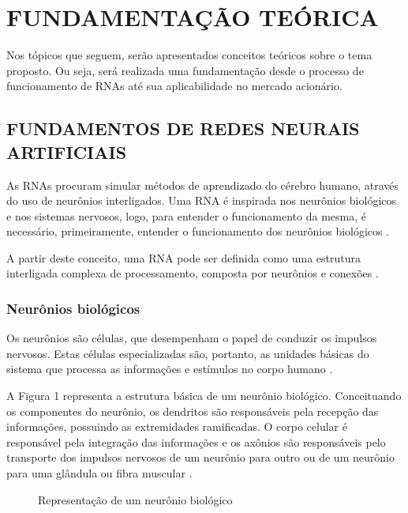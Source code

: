 
\chapter{FUNDAMENTAÇÃO TEÓRICA}\label{ch:fundaments-teorico}
Nos tópicos que seguem, serão apresentados conceitos teóricos sobre o tema proposto. Ou seja, será realizada uma fundamentação desde o processo de funcionamento de RNAs até sua aplicabilidade no mercado acionário.

\section{FUNDAMENTOS DE REDES NEURAIS ARTIFICIAIS}\label{sec:fundamentos}
As RNAs procuram simular métodos de aprendizado do cérebro humano, através do uso de neurônios interligados. Uma RNA é inspirada nos neurônios biológicos e nos sistemas nervosos, logo, para entender o funcionamento da mesma, é necessário, primeiramente, entender o funcionamento dos neurônios biológicos \cite{neto}.

A partir deste conceito, uma RNA pode ser definida como uma estrutura interligada complexa de processamento, composta por neurônios e conexões \cite{ferreira}.

\subsection{Neurônios biológicos} 
Os neurônios são células, que desempenham o papel de conduzir os impulsos nervosos. Estas células especializadas são, portanto, as unidades básicas do sistema que processa as informações e estímulos no corpo humano \cite{lent}. 

A Figura 1 representa a estrutura básica de um neurônio biológico. Conceituando os componentes do neurônio, os dendritos são responsáveis pela recepção das informações, possuindo as extremidades ramificadas. O corpo celular é responsável pela integração das informações e os axônios são responsáveis pelo transporte dos impulsos nervosos de um neurônio para outro ou de um neurônio para uma glândula ou fibra muscular \cite{lent}.

\begin{figure}[h]
	\centering
	\caption{Representação de um neurônio biológico}
	\label{exec-linearmente-separavel}
\end{figure} 

